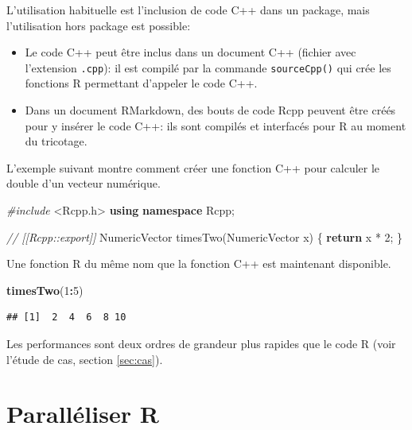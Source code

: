 \documentclass[
  12pt,
  french,
  a4paper,
  extrafontsizes,onecolumn,openright
  ]{memoir}
\newenvironment{Shaded}{\begin{snugshade}}{\end{snugshade}}
\newcommand{\CommentTok}[1]{\textcolor[rgb]{0.56,0.35,0.01}{\textit{#1}}}
\newcommand{\ControlFlowTok}[1]{\textcolor[rgb]{0.13,0.29,0.53}{\textbf{#1}}}
\newcommand{\DecValTok}[1]{\textcolor[rgb]{0.00,0.00,0.81}{#1}}
\newcommand{\ImportTok}[1]{#1}
\newcommand{\KeywordTok}[1]{\textcolor[rgb]{0.13,0.29,0.53}{\textbf{#1}}}
\newcommand{\NormalTok}[1]{#1}
\newcommand{\OperatorTok}[1]{\textcolor[rgb]{0.81,0.36,0.00}{\textbf{#1}}}
\newcommand{\PreprocessorTok}[1]{\textcolor[rgb]{0.56,0.35,0.01}{\textit{#1}}}
\providecommand{\tightlist}{%
  \setlength{\itemsep}{0pt}\setlength{\parskip}{0pt}}
\newlength{\rf}
\begin{document}
L'utilisation habituelle est l'inclusion de code C++ dans un package, mais l'utilisation hors package est possible:

\begin{itemize}
\tightlist
\item
  Le code C++ peut être inclus dans un document C++ (fichier avec l'extension \texttt{.cpp}): il est compilé par la commande \texttt{sourceCpp()} qui crée les fonctions R permettant d'appeler le code C++.
\item
  Dans un document RMarkdown, des bouts de code Rcpp peuvent être créés pour y insérer le code C++: ils sont compilés et interfacés pour R au moment du tricotage.
\end{itemize}

L'exemple suivant montre comment créer une fonction C++ pour calculer le double d'un vecteur numérique.

\scriptsize

\begin{Shaded}
\begin{Highlighting}[]
\PreprocessorTok{#include }\ImportTok{<Rcpp.h>}
\KeywordTok{using} \KeywordTok{namespace}\NormalTok{ Rcpp;}

\CommentTok{// [[Rcpp::export]]}
\NormalTok{NumericVector timesTwo(NumericVector x) \{}
  \ControlFlowTok{return}\NormalTok{ x * }\DecValTok{2}\NormalTok{;}
\NormalTok{\}}
\end{Highlighting}
\end{Shaded}

\normalsize

Une fonction R du même nom que la fonction C++ est maintenant disponible.

\scriptsize

\begin{Shaded}
\begin{Highlighting}[]
\KeywordTok{timesTwo}\NormalTok{(}\DecValTok{1}\OperatorTok{:}\DecValTok{5}\NormalTok{)}
\end{Highlighting}
\end{Shaded}

\begin{verbatim}
## [1]  2  4  6  8 10
\end{verbatim}

\normalsize

Les performances sont deux ordres de grandeur plus rapides que le code R (voir l'étude de cas, section \ref{sec:cas}).

\hypertarget{paralluxe9liser-r}{%
\section{Paralléliser R}\label{paralluxe9liser-r}}
\end{document}
